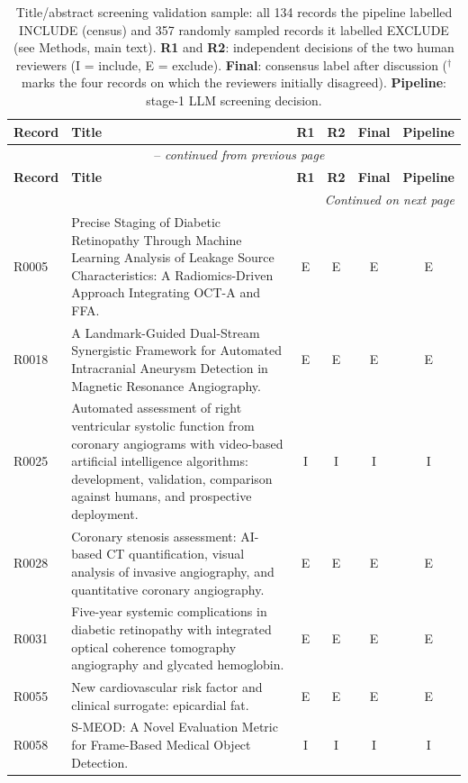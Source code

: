 \renewcommand{\arraystretch}{1.05}
\footnotesize
\begin{longtable}{@{}l p{8.6cm} c c c c@{}}
\caption{Title/abstract screening validation sample: all 134 records the pipeline labelled INCLUDE (census) and 357 randomly sampled records it labelled EXCLUDE (see Methods, main text). \textbf{R1} and \textbf{R2}: independent decisions of the two human reviewers (I = include, E = exclude). \textbf{Final}: consensus label after discussion ($^{\dagger}$ marks the four records on which the reviewers initially disagreed). \textbf{Pipeline}: stage-1 LLM screening decision.}
\label{tab:screening_validation_full} \\
\toprule
\textbf{Record} & \textbf{Title} & \textbf{R1} & \textbf{R2} & \textbf{Final} & \textbf{Pipeline} \\
\midrule
\endfirsthead
\multicolumn{6}{c}{\tablename~\thetable{} -- \textit{continued from previous page}} \\
\toprule
\textbf{Record} & \textbf{Title} & \textbf{R1} & \textbf{R2} & \textbf{Final} & \textbf{Pipeline} \\
\midrule
\endhead
\midrule
\multicolumn{6}{r}{\textit{Continued on next page}} \\
\endfoot
\bottomrule
\endlastfoot
R0005 & Precise Staging of Diabetic Retinopathy Through Machine Learning Analysis of Leakage Source Characteristics: A Radiomics-Driven Approach Integrating OCT-A and FFA. & E & E & E & E \\
R0018 & A Landmark-Guided Dual-Stream Synergistic Framework for Automated Intracranial Aneurysm Detection in Magnetic Resonance Angiography. & E & E & E & E \\
R0025 & Automated assessment of right ventricular systolic function from coronary angiograms with video-based artificial intelligence algorithms: development, validation, comparison against humans, and prospective deployment. & I & I & I & I \\
R0028 & Coronary stenosis assessment: AI-based CT quantification, visual analysis of invasive angiography, and quantitative coronary angiography. & E & E & E & E \\
R0031 & Five-year systemic complications in diabetic retinopathy with integrated optical coherence tomography angiography and glycated hemoglobin. & E & E & E & E \\
R0055 & New cardiovascular risk factor and clinical surrogate: epicardial fat. & E & E & E & E \\
R0058 & S-MEOD: A Novel Evaluation Metric for Frame-Based Medical Object Detection. & I & I & I & I \\

\end{longtable}
